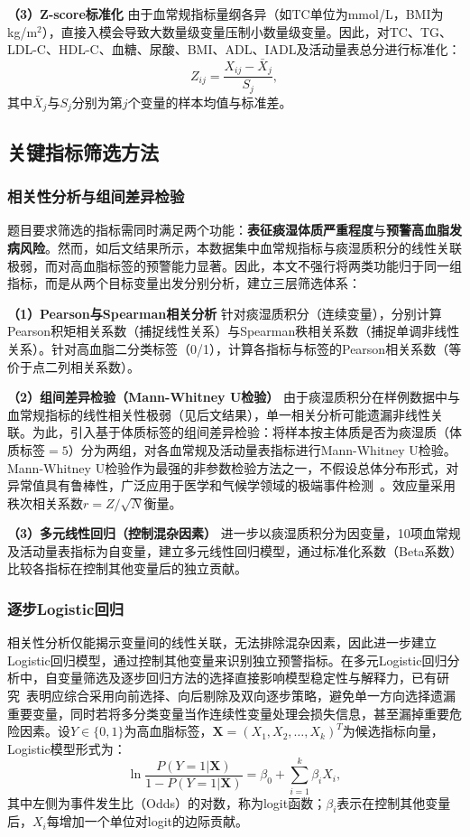 \documentclass[a4paper,12pt]{ctexart}
\begin{document}
\textbf{（3）Z-score标准化}
由于血常规指标量纲各异（如TC单位为mmol/L，BMI为kg/m$^2$），直接入模会导致大数量级变量压制小数量级变量。因此，对TC、TG、LDL-C、HDL-C、血糖、尿酸、BMI、ADL、IADL及活动量表总分进行标准化：
\begin{equation}
Z_{ij}=\frac{X_{ij}-\bar{X}_j}{S_j},
\end{equation}
其中$\bar{X}_j$与$S_j$分别为第$j$个变量的样本均值与标准差。

\subsection{关键指标筛选方法}

\subsubsection{相关性分析与组间差异检验}
题目要求筛选的指标需同时满足两个功能：\textbf{表征痰湿体质严重程度}与\textbf{预警高血脂发病风险}。然而，如后文结果所示，本数据集中血常规指标与痰湿质积分的线性关联极弱，而对高血脂标签的预警能力显著。因此，本文不强行将两类功能归于同一组指标，而是从两个目标变量出发分别分析，建立三层筛选体系：

\textbf{（1）Pearson与Spearman相关分析}
针对痰湿质积分（连续变量），分别计算Pearson积矩相关系数（捕捉线性关系）与Spearman秩相关系数（捕捉单调非线性关系）。针对高血脂二分类标签（0/1），计算各指标与标签的Pearson相关系数（等价于点二列相关系数）。

\textbf{（2）组间差异检验（Mann-Whitney U检验）}
由于痰湿质积分在样例数据中与血常规指标的线性相关性极弱（见后文结果），单一相关分析可能遗漏非线性关联。为此，引入基于体质标签的组间差异检验：将样本按主体质是否为痰湿质（体质标签$=5$）分为两组，对各血常规及活动量表指标进行Mann-Whitney U检验。Mann-Whitney U检验作为最强的非参数检验方法之一，不假设总体分布形式，对异常值具有鲁棒性，广泛应用于医学和气候学领域的极端事件检测~\cite{yang1999mann,yu2009mann}。效应量采用秩次相关系数$r=Z/\sqrt{N}$衡量。

\textbf{（3）多元线性回归（控制混杂因素）}
进一步以痰湿质积分为因变量，10项血常规及活动量表指标为自变量，建立多元线性回归模型，通过标准化系数（Beta系数）比较各指标在控制其他变量后的独立贡献。

\subsubsection{逐步Logistic回归}
相关性分析仅能揭示变量间的线性关联，无法排除混杂因素，因此进一步建立Logistic回归模型，通过控制其他变量来识别独立预警指标。在多元Logistic回归分析中，自变量筛选及逐步回归方法的选择直接影响模型稳定性与解释力，已有研究~\cite{xu2016logistic}表明应综合采用向前选择、向后剔除及双向逐步策略，避免单一方向选择遗漏重要变量，同时若将多分类变量当作连续性变量处理会损失信息，甚至漏掉重要危险因素。设$Y\in\{0,1\}$为高血脂标签，$\boldsymbol{X}=(X_1,X_2,\dots,X_k)^T$为候选指标向量，Logistic模型形式为：
\begin{equation}
\ln\frac{P(Y=1|\boldsymbol{X})}{1-P(Y=1|\boldsymbol{X})} = \beta_0 + \sum_{i=1}^{k}\beta_i X_i,
\end{equation}
其中左侧为事件发生比（Odds）的对数，称为logit函数；$\beta_i$表示在控制其他变量后，$X_i$每增加一个单位对logit的边际贡献。
\end{document}
